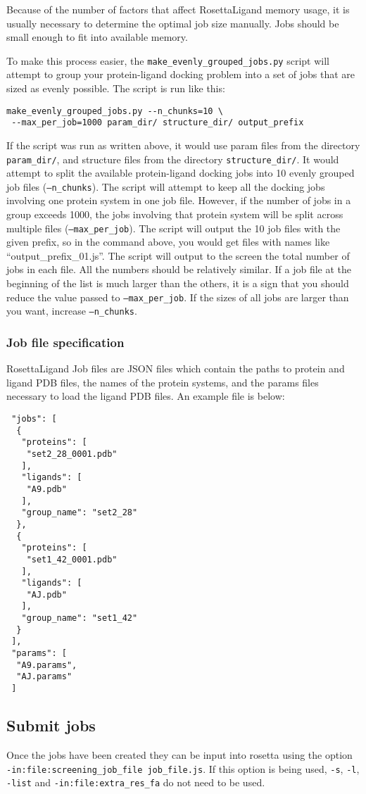 Because of the number of factors that affect RosettaLigand memory usage, it is usually necessary to determine the optimal job size manually.
Jobs should be small enough to fit into available memory.

To make this process easier, the \texttt{make\_evenly\_grouped\_jobs.py} script will attempt to group your protein-ligand docking problem into a set of jobs that are sized as evenly possible. 
The script is run like this:

\begin{verbatim}
make_evenly_grouped_jobs.py --n_chunks=10 \
 --max_per_job=1000 param_dir/ structure_dir/ output_prefix
\end{verbatim}

If the script was run as written above, it would use param files from the directory \texttt{param\_dir/}, and structure files from the directory \texttt{structure\_dir/}.
It would attempt to split the available protein-ligand docking jobs into 10 evenly grouped job files (\texttt{--n\_chunks}).
The script will attempt to keep all the docking jobs involving one protein system in one job file. However, if the number of jobs in a group exceeds 1000,
the jobs involving that protein system will be split across multiple files (\texttt{--max\_per\_job}). 
The script will output the 10 job files with the given prefix, so in the command above, you would get files with names like ``output\_prefix\_01.js''.
The script will output to the screen the total number of jobs in each file. All the numbers should be relatively similar. 
If a job file at the beginning of the list is much larger than the others, it is a sign that you should reduce the value passed to \texttt{--max\_per\_job}. If the sizes of all jobs are larger than you want, increase \texttt{--n\_chunks}.

\subsubsection{Job file specification}

RosettaLigand Job files are \ac{JSON} files which contain the paths to protein and ligand \ac{PDB} files, the names of the protein systems,
and the params files necessary to load the ligand \ac{PDB} files.
An example file is below:

\begin{verbatim}
 "jobs": [
  {
   "proteins": [
    "set2_28_0001.pdb"
   ],
   "ligands": [
    "A9.pdb"
   ],
   "group_name": "set2_28"
  },
  {
   "proteins": [
    "set1_42_0001.pdb"
   ],
   "ligands": [
    "AJ.pdb"
   ],
   "group_name": "set1_42"
  }
 ],
 "params": [
  "A9.params",
  "AJ.params"
 ]
\end{verbatim}

\subsection{Submit jobs}

Once the jobs have been created they can be input into rosetta using the option\\
\texttt{-in:file:screening\_job\_file job\_file.js}.
If this option is being used, \texttt{-s}, \texttt{-l}, \texttt{-list} and \texttt{-in:file:extra\_res\_fa} do not need to be used.
